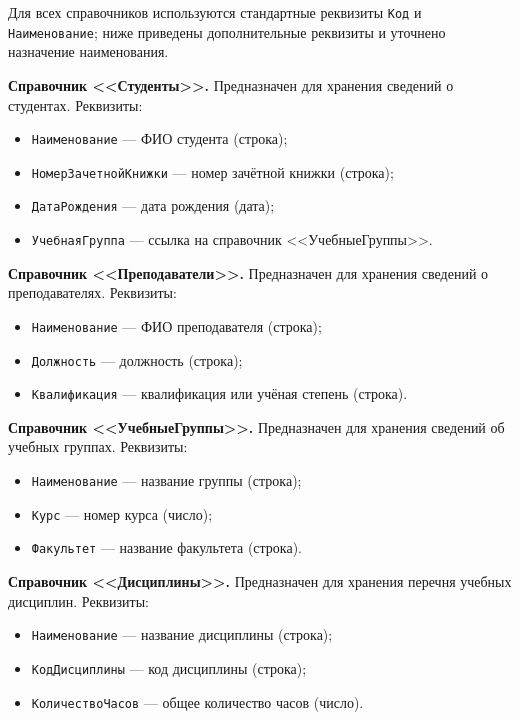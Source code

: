 \documentclass[14pt,a4paper]{extarticle}
\begin{document}
Для всех справочников используются стандартные реквизиты \texttt{Код} и
\texttt{Наименование}; ниже приведены дополнительные реквизиты и уточнено
назначение наименования.

\noindent\textbf{Справочник <<Студенты>>.}
Предназначен для хранения сведений о студентах. Реквизиты:

\begin{itemize}
    \item \texttt{Наименование} --- ФИО студента (строка);
    \item \texttt{НомерЗачетнойКнижки} --- номер зачётной книжки (строка);
    \item \texttt{ДатаРождения} --- дата рождения (дата);
    \item \texttt{УчебнаяГруппа} --- ссылка на справочник <<УчебныеГруппы>>.
\end{itemize}

\noindent\textbf{Справочник <<Преподаватели>>.}
Предназначен для хранения сведений о преподавателях. Реквизиты:

\begin{itemize}
    \item \texttt{Наименование} --- ФИО преподавателя (строка);
    \item \texttt{Должность} --- должность (строка);
    \item \texttt{Квалификация} --- квалификация или учёная степень (строка).
\end{itemize}

\noindent\textbf{Справочник <<УчебныеГруппы>>.}
Предназначен для хранения сведений об учебных группах. Реквизиты:

\begin{itemize}
    \item \texttt{Наименование} --- название группы (строка);
    \item \texttt{Курс} --- номер курса (число);
    \item \texttt{Факультет} --- название факультета (строка).
\end{itemize}

\noindent\textbf{Справочник <<Дисциплины>>.}
Предназначен для хранения перечня учебных дисциплин. Реквизиты:

\begin{itemize}
    \item \texttt{Наименование} --- название дисциплины (строка);
    \item \texttt{КодДисциплины} --- код дисциплины (строка);
    \item \texttt{КоличествоЧасов} --- общее количество часов (число).
\end{itemize}
\end{document}
